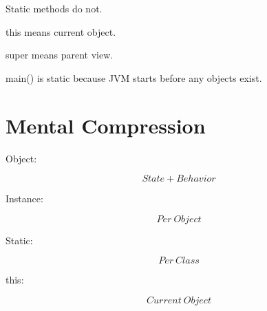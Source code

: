 \documentclass[11pt,a4paper]{book}
\begin{document}

\begin{rosettarule}

Static methods do not.

\end{rosettarule}


\begin{rosettarule}

this means current object.

\end{rosettarule}


\begin{rosettarule}

super means parent view.

\end{rosettarule}


\begin{rosettarule}

main() is static because JVM starts
before any objects exist.

\end{rosettarule}


\section{Mental Compression}

Object:

\[
State
+
Behavior
\]


Instance:

\[
Per\ Object
\]


Static:

\[
Per\ Class
\]


this:

\[
Current\ Object
\]

\end{document}
